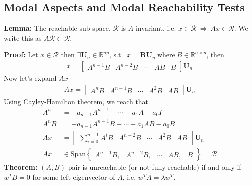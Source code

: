 \documentclass[twoside]{article}
\begin{document}
\subsection{Modal Aspects and Modal Reachability Tests}

\textbf{Lemma:} The reachable sub-space, $\mathcal{R}$ is $A$ invariant, i.e. $x\in \mathcal{R} \ \Rightarrow \ A x \in \mathcal{R}$. We 
write this as $A \mathcal{R} \subset \mathcal{R}$.

\textbf{Proof:} Let $x \in \mathcal{R}$ then $\exists \textbf{U}_n \in \mathbb{R}^{n p}$, s.t. $\ x = \mathbf{R} \textbf{U}_n 
 \ \mathrm{where} \ B \in \mathbb{R}^{n \times p}$, then
%
\begin{align*}
 x = \left[ \begin{array}{c|c|c|c|c} A^{n-1} B & A^{n-2} B &
         \cdots & A B & B \end{array} \right] \textbf{U}_n 
\end{align*}
%
Now let's expand $A x$
%
\begin{align*}
 A x = \left[ \begin{array}{c|c|c|c|c} A^{n} B & A^{n-1} B &
         \cdots & A^2 B & A B \end{array} \right] \textbf{U}_n 
\end{align*}
%
Using Cayley-Hamilton theorem, we reach that
%
%
\begin{align*}
 A^n &= -a_{n-1} A^{n-1} - \cdots - a_1 A - a_0 I
 \\
 A^n B &= -a_{n-1} A^{n-1} B - \cdots - a_1 A B - a_0 B
 \\
 A x &= \left[ \begin{array}{c|c|c|c|c} \sum\limits_{i=0}^{n-1} A^{i} B & A^{n-2} B &
         \cdots & A^2 B & A B \end{array} \right] \textbf{U}_n 
 \\
 A x &\in \mathrm{Span} \left\lbrace \begin{array}{ccccc} A^{n-1} B , & A^{n-2} B , &
         \cdots & A B , & B \end{array} \right\rbrace = \mathcal{R}
\end{align*}
%
\textbf{Theorem:} $(A,B)$ pair is unreachable (or not fully reachable) if and only if $w^T B = 0$ for some left eigenvector of $A$, i.e. 
$w^T A = \lambda w^T$.
\end{document}
